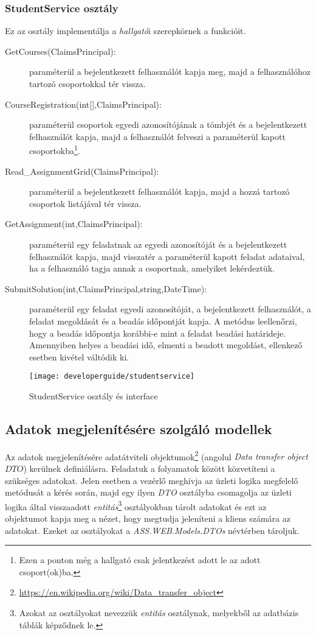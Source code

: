 \subsubsection{StudentService osztály}
Ez az osztály implementálja a \emph{hallgató}i szerepkörnek a funkcióit.
\begin{description}
	\item[GetCourses(ClaimsPrincipal):] paraméterül a bejelentkezett felhasználót kapja meg, majd a felhasználóhoz tartozó csoportokkal tér vissza.
	\item[CourseRegistration(int{[]},ClaimsPrincipal):] paraméterül csoportok egyedi azonosítójának a tömbjét és a bejelentkezett felhasználót kapja, majd a felhasználót felveszi a paraméterül kapott csoportokba\footnote{Ezen a ponton még a hallgató csak jelentkezést adott le az adott csoport(ok)ba.}.
	\item[Read\_AssignmentGrid(ClaimsPrincipal):] paraméterül a bejelentkezett felhasználót kapja, majd a hozzá tartozó csoportok listájával tér vissza.
	\item[GetAssignment(int,ClaimsPrincipal):] paraméterül egy feladatnak az egyedi azonosítóját és a bejelentkezett felhasználót kapja, majd visszatér a paraméterül kapott feladat adataival, ha a felhasználó tagja annak a csoportnak, amelyiket lekérdeztük.
	\item[SubmitSolution(int,ClaimsPrincipal,string,DateTime):] paraméterül egy feladat egyedi azonosítóját, a bejelentkezett felhasználót, a feladat megoldását és a beadás időpontját kapja. A metódus leellenőrzi, hogy a beadás időpontja korábbi-e mint a feladat beadási határideje. Amennyiben helyes a beadási idő, elmenti a beadott megoldást, ellenkező esetben kivétel váltódik ki.
\end{description}
\begin{figure}[H]
	\centering
	\texttt{[image: developerguide/studentservice]}
	\caption{StudentService osztály és interface}
	\label{fig:bll-studentservice}
\end{figure}
\subsection{Adatok megjelenítésére szolgáló modellek}
Az adatok megjelenítésére adatátviteli objektumok\footnote{\url{https://en.wikipedia.org/wiki/Data_transfer_object}} (angolul \emph{Data transfer object \(DTO\)}) kerülnek definiálásra. Feladatuk a folyamatok között közvetíteni a szükséges adatokat. Jelen esetben a vezérlő meghívja az üzleti logika megfelelő metódusát a kérés során, majd egy ilyen \emph{DTO} osztályba csomagolja az üzleti logika által visszaadott \emph{entitás}\footnote{Azokat az osztályokat nevezzük \emph{entitás} osztálynak, melyekből az adatbázis táblák képződnek le.} osztályokban tárolt adatokat és ezt az objektumot kapja meg a nézet, hogy megtudja jeleníteni a kliens számára az adatokat. Ezeket az osztályokat a \emph{ASS.WEB.Models.DTOs} névtérben tároljuk.
